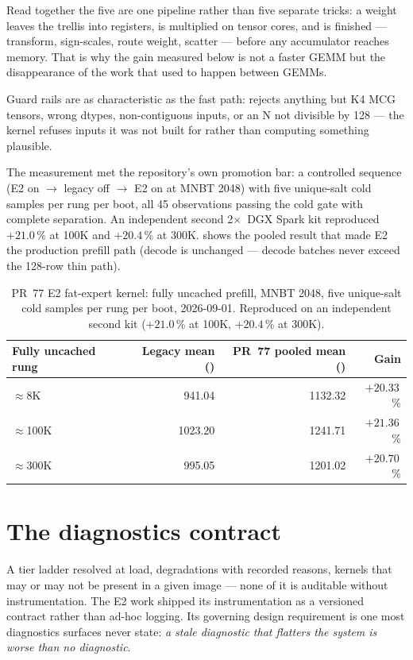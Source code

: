 Read together the five are one pipeline rather than five separate tricks: a
weight leaves the trellis into registers, is multiplied on tensor cores, and
is finished --- transform, sign-scales, route weight, scatter --- before any
accumulator reaches memory. That is why the gain measured below is not a
faster GEMM but the disappearance of the work that used to happen between
GEMMs.

Guard rails are as characteristic as the fast path: 
rejects anything but K4 MCG tensors, wrong dtypes, non-contiguous inputs,
or an N not divisible by 128 --- the kernel refuses inputs it was not built
for rather than computing something plausible.

The measurement met the repository's own promotion bar: a controlled sequence (E2
on $\to$ legacy off $\to$ E2 on at MNBT 2048) with five unique-salt cold
samples per rung per boot, all 45 observations passing the cold gate with
complete separation. An independent second 2$\times$~DGX Spark kit
reproduced $+21.0$\,\% at 100K and $+20.4$\,\% at 300K.
 shows the pooled result that made E2 the production
prefill path (decode is unchanged --- decode batches never exceed the
128-row thin path).

\begin{table}[htbp]
\centering\small
\caption{PR~77 E2 fat-expert kernel: fully uncached prefill, MNBT 2048, five
unique-salt cold samples per rung per boot, 2026-09-01. Reproduced on an
independent second kit ($+21.0$\,\% at 100K, $+20.4$\,\% at 300K).}
\label{tab:qbet-e2}
\begin{tabular}{lrrr}
\toprule
Fully uncached rung & Legacy mean (\tokspersec{}) & PR~77 pooled mean (\tokspersec{}) & Gain \\
\midrule
$\approx$8K   & 941.04  & 1132.32 & $+20.33$\,\% \\
$\approx$100K & 1023.20 & 1241.71 & $+21.36$\,\% \\
$\approx$300K & 995.05  & 1201.02 & $+20.70$\,\% \\
\bottomrule
\end{tabular}
\end{table}

\section{The diagnostics contract}
\label{sec:qbet-diag}

A tier ladder resolved at load, degradations with recorded reasons, kernels
that may or may not be present in a given image --- none of it is auditable
without instrumentation. The E2 work shipped its instrumentation as a
versioned contract rather than ad-hoc logging. Its governing design
requirement is one most diagnostics surfaces never state: \emph{a stale
diagnostic that flatters the system is worse than no diagnostic}.

